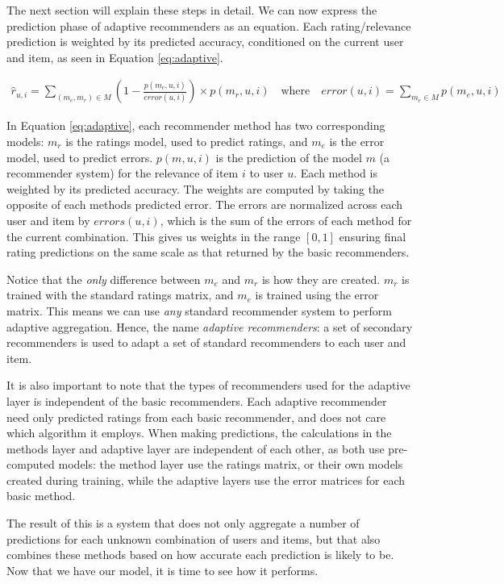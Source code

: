 The next section will explain these steps in detail.
We can now express the prediction phase of adaptive recommenders as an equation.
Each rating/relevance prediction is weighted by its predicted accuracy,
conditioned on the current user and item,
as seen in Equation \ref{eq:adaptive}.

\begin{figure*}[!t]
\normalsize
\begin{eqnarray}
  \label{eq:adaptive}
  \hat{r}_{u,i} = \sum_{(m_{e}, m_{r}) \in M} (1 - 
  \frac{
    p(m_{e},u,i)
  }{
    error(u,i)
  }) \times p(m_{r},u,i)
  \quad
  \text{where}
  \quad
  error(u,i) = \sum_{m_e \in M} p(m_e,u,i) 
\end{eqnarray}
\hrulefill
\vspace*{4pt}
\end{figure*}

In Equation \ref{eq:adaptive}, each recommender method has two corresponding models:
$m_r$ is the ratings model, used to predict ratings, and
$m_e$ is the error model, used to predict errors.
$p(m,u,i)$ is the prediction of the model $m$ (a recommender system)
for the relevance of item $i$ to user $u$.
Each method is weighted by its predicted accuracy.
The weights are computed by taking the opposite
of each methods predicted error.
The errors are normalized across each user and item by $errors(u,i)$,
which is the sum of the errors of each method for the current combination.
This gives us weights in the range $[0,1]$ ensuring
final rating predictions on the same scale as that returned by the basic recommenders.

Notice that the \emph{only} difference between $m_e$ and $m_r$ is how they are created.
$m_r$ is trained with the standard ratings matrix, and $m_e$ is trained using the error matrix.
This means we can use \emph{any} standard recommender system to perform adaptive aggregation.
Hence, the name \emph{adaptive recommenders}:
a set of secondary recommenders is used to adapt a set of standard
recommenders to each user and item.

It is also important to note that the types of recommenders used for the adaptive layer
is independent of the basic recommenders.
Each adaptive recommender need only predicted ratings from each basic recommender,
and does not care which algorithm it employs.
When making predictions, the calculations in the methods layer and adaptive layer
are independent of each other, as both use pre-computed models:
the method layer use the ratings matrix, or their own models
created during training, while the adaptive layers use the error matrices for each
basic method.

The result of this is a system that does not only aggregate a number of predictions for each unknown
combination of users and items,
but that also combines these methods based on how accurate each prediction is likely to be.
Now that we have our model, it is time to see how it performs.


